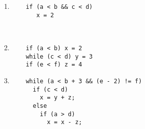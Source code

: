 \documentclass[11pt,portuguese,a4paper]{article}
\begin{document}
\begin{multicols}{2}
\begin{enumerate}

\item 
  \begin{lstlisting}
    if (a < b && c < d)
       x = 2
  \end{lstlisting} \ \\

\item 
  \begin{lstlisting}
    if (a < b) x = 2
    while (c < d) y = 3
    if (e < f) z = 4
  \end{lstlisting}


\item 
  \begin{lstlisting}
    while (a < b + 3 && (e - 2) != f)
      if (c < d)
        x = y + z;
      else
        if (a > d)
          x = x - z;
  \end{lstlisting}
\end{enumerate}
\end{multicols}
\end{document}
